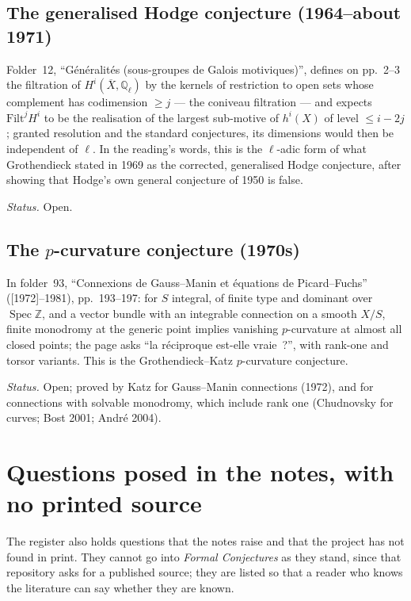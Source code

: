 \documentclass[11pt,a4paper]{article}
\newcommand{\q}[1]{“#1”}
\begin{document}
\subsection{The generalised Hodge conjecture (1964--about 1971)}
Folder~12, \q{Généralités (sous-groupes de Galois motiviques)}, defines on
pp.~2--3 the filtration of $H^i(\overline X, \mathbb Q_\ell)$ by the kernels of
restriction to open sets whose complement has codimension $\geq j$ --- the
coniveau filtration --- and expects $\mathrm{Filt}^j H^i$ to be the
realisation of the largest sub-motive of $h^i(X)$ of level $\leq i - 2j$;
granted resolution and the standard conjectures, its dimensions would then
be independent of $\ell$. In the reading's words, this is the $\ell$-adic
form of what Grothendieck stated in 1969 as the corrected, generalised Hodge
conjecture, after showing that Hodge's own general conjecture of 1950 is
false.

\emph{Status.} Open.

\subsection{The $p$-curvature conjecture (1970s)}
In folder~93, \q{Connexions de Gauss--Manin et équations de Picard--Fuchs}
([1972]--1981), pp.~193--197: for $S$ integral, of finite type and dominant
over $\operatorname{Spec}\mathbb Z$, and a vector bundle with an integrable
connection on a smooth $X/S$, finite monodromy at the generic point implies
vanishing $p$-curvature at almost all closed points; the page asks
\q{la réciproque est-elle vraie~?}, with rank-one and torsor variants. This
is the Grothendieck--Katz $p$-curvature conjecture.

\emph{Status.} Open; proved by Katz for Gauss--Manin connections (1972), and
for connections with solvable monodromy, which include rank one (Chudnovsky
for curves; Bost 2001; André 2004).

\section{Questions posed in the notes, with no printed source}

The register also holds questions that the notes raise and that the project
has not found in print. They cannot go into \emph{Formal Conjectures} as they
stand, since that repository asks for a published source; they are listed so
that a reader who knows the literature can say whether they are known.
\end{document}
